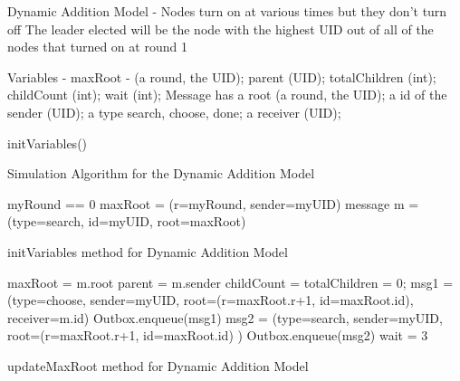 \documentclass[english]{article}
\begin{document}
Dynamic Addition Model - Nodes turn on at various times but they don't turn off 
The leader elected will be the node with the highest UID out of all of the nodes that turned on at round 1

Variables - maxRoot - (a round, the UID); parent (UID); totalChildren (int); childCount (int); wait (int);
Message has a root (a round, the UID); a id of the sender (UID); a type {search, choose, done}; a receiver (UID);

\begin{algorithm}
  initVariables() \;

  \caption{Simulation Algorithm for the Dynamic Addition Model}
\end{algorithm}

\begin{algorithm}[initVariables]
  myRound == 0 \;
  maxRoot = (r=myRound, sender=myUID) \; 
  message m = (type=search, id=myUID, root=maxRoot) \;
  \caption{initVariables method for Dynamic Addition Model}
\end{algorithm}

\begin{algorithm}
  maxRoot = m.root\; %
  parent = m.sender\; %
  childCount = totalChildren = 0; %
  msg1 = (type=choose, sender=myUID, root=(r=maxRoot.r+1, id=maxRoot.id), receiver=m.id) \; %
  Outbox.enqueue(msg1) \;
  msg2 = (type=search, sender=myUID, root=(r=maxRoot.r+1, id=maxRoot.id) ) \; %
  Outbox.enqueue(msg2) \;
  wait = 3 \; %
  \caption{updateMaxRoot method for Dynamic Addition Model}
\end{algorithm}
\end{document}

